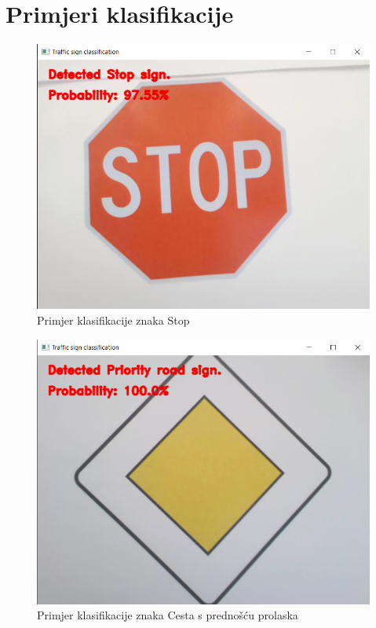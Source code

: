 \documentclass[times, utf8, zavrsni]{fer}
\begin{document}
\listoffigures
\appendix
\chapter{Primjeri klasifikacije}
\begin{figure}[h!]
  \includegraphics[width=\linewidth,trim=4 4 4 4,clip]{images/stop.jpeg}
  \caption{Primjer klasifikacije znaka Stop}
\end{figure}
\begin{figure}[h!]
  \includegraphics[width=\linewidth,trim=4 4 4 4,clip]{images/priority_road.jpeg}
  \caption{Primjer klasifikacije znaka Cesta s prednošću prolaska}
\end{figure}
\end{document}
